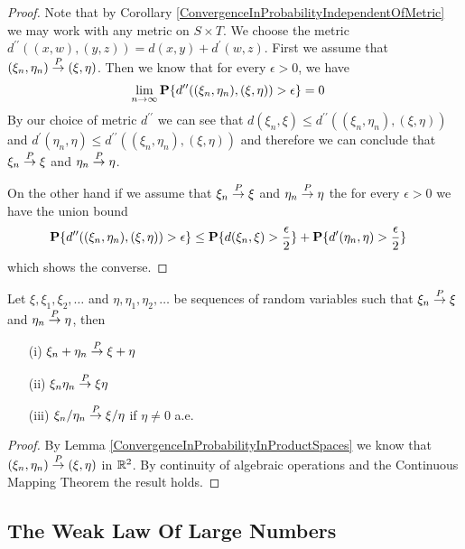 \begin{proof}
Note that by Corollary
\ref{ConvergenceInProbabilityIndependentOfMetric} we may work with any
metric on $S \times T$.  We choose the metric $d^{\prime\prime}((x,w), (y,z)) =
d(x,y) + d^\prime(w,z)$.
First we assume that $(\xi_n, \eta_n) \overset{P}\to (\xi, \eta)$.  Then we
know that for every $\epsilon > 0$, we have
\begin{align*}
\lim_{n \to \infty} \textbf{P}\{d^{\prime\prime}((\xi_n,\eta_n),
  (\xi, \eta)) > \epsilon\} &= 0
\end{align*}
By our choice of metric $d^{\prime\prime}$ we can see that $d(\xi_n,
\xi) \leq d^{\prime\prime}((\xi_n,\eta_n),
  (\xi, \eta))$ and $d^\prime(\eta_n,\eta) \leq d^{\prime\prime}((\xi_n,\eta_n),
  (\xi, \eta))$ and therefore we can conclude that $\xi_n \overset{P}\to \xi$
  and $\eta_n \overset{P}\to \eta$.  

On the other hand if we assume that  $\xi_n \overset{P}\to \xi$ and $\eta_n
\overset{P}\to \eta$ the for every $\epsilon > 0$ we have the union bound
\begin{align*}
\textbf{P}\{d^{\prime\prime}((\xi_n,\eta_n),
  (\xi, \eta)) > \epsilon\} &\leq \textbf{P}\{d(\xi_n,\xi) > \frac{\epsilon}{2}\}
  + \textbf{P}\{d^\prime(\eta_n,\eta) > \frac{\epsilon}{2}\}
\end{align*}
which shows the converse.
\end{proof}
\begin{cor}\label{ConvergenceInProbabilityAndAlgebraicOperations}Let $\xi, \xi_1, \xi_2, \dots$ and $\eta, \eta_1, \eta_2,
  \dots$ be sequences of random variables such that $\xi_n \overset{P}\to
  \xi$ and $\eta_n \overset{P}\to \eta$, then 
\begin{itemize}
\item[(i)] $\xi_n + \eta_n \overset{P}\to \xi + \eta$
\item[(ii)] $\xi_n  \eta_n \overset{P}\to \xi \eta$
\item[(iii)] $\xi_n / \eta_n \overset{P}\to \xi /\eta$ if $\eta \neq 0$ a.e.
\end{itemize}
\end{cor}
\begin{proof}
By Lemma \ref{ConvergenceInProbabilityInProductSpaces} we know that
$(\xi_n, \eta_n) \overset{P}\to (\xi, \eta)$ in $\mathbb{R}^2$.  By continuity of algebraic
operations and the Continuous Mapping Theorem the result holds.
\end{proof}


\subsection{The Weak Law Of Large Numbers}

